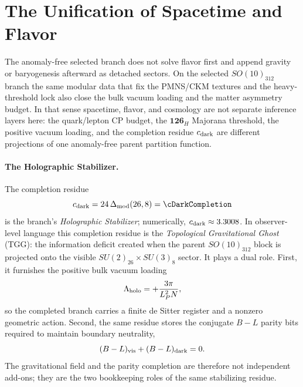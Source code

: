 \documentclass[11pt]{article}
\begin{document}
\section{The Unification of Spacetime and Flavor}\label{sec:topological-baryogenesis}

The anomaly-free selected branch does not solve flavor first and append gravity or
baryogenesis afterward as detached sectors. On the selected $SO(10)_{312}$
branch the same modular data that fix the PMNS/CKM textures and the
heavy-threshold lock also close the bulk vacuum loading and the matter
asymmetry budget. In that sense spacetime, flavor, and cosmology are not
separate inference layers here: the quark/lepton CP budget, the
$\mathbf{126}_H$ Majorana threshold, the positive vacuum loading, and the
completion residue $c_{\rm dark}$ are different projections of one anomaly-free
parent partition function.

\paragraph{The Holographic Stabilizer.}
The completion residue
\begin{equation}
 c_{\rm dark}=24\,\Delta_{\rm mod}(26,8)=\cDarkCompletion
\end{equation}
is the branch's \emph{Holographic Stabilizer}; numerically,
$c_{\rm dark}\approx3.3008$. In observer-level language this completion residue
is the \emph{Topological Gravitational Ghost} (TGG): the information deficit
created when the parent $SO(10)_{312}$ block is projected onto the visible
$SU(2)_{26}\times SU(3)_8$ sector. It plays a dual role. First, it furnishes the
positive bulk vacuum loading
\begin{equation}
 \Lambda_{\rm holo}=+\frac{3\pi}{L_P^2N},
\end{equation}
so the completed branch carries a finite de Sitter register and a nonzero
geometric action. Second, the same residue stores the conjugate $B-L$ parity
bits required to maintain boundary neutrality,
\begin{equation}
 (B-L)_{\rm vis}+(B-L)_{\rm dark}=0.
\end{equation}
The gravitational field and the parity completion are therefore not independent
add-ons; they are the two bookkeeping roles of the same stabilizing residue.
\end{document}
